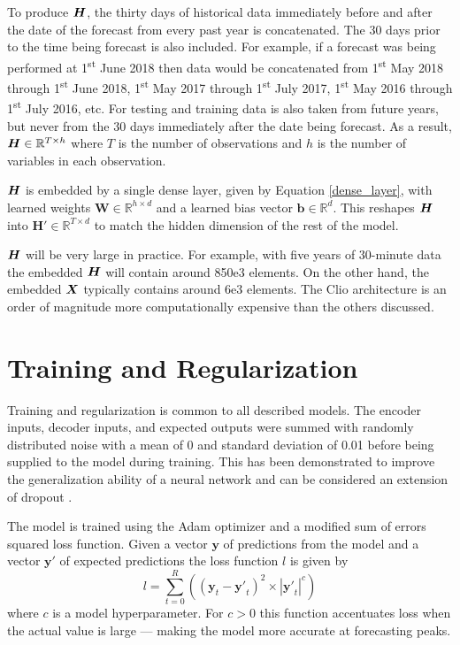 To produce ${\bm{H}}$, the thirty days of historical data immediately before and after the date of the forecast from every past year is concatenated.
The 30 days prior to the time being forecast is also included.
For example, if a forecast was being performed at 1\textsuperscript{st} June 2018 then data would be concatenated from 1\textsuperscript{st} May 2018 through 1\textsuperscript{st} June 2018, 1\textsuperscript{st} May 2017 through 1\textsuperscript{st} July 2017, 1\textsuperscript{st} May 2016 through 1\textsuperscript{st} July 2016, etc.
For testing and training data is also taken from future years, but never from the 30 days immediately after the date being forecast.
As a result, ${\bm{H}} \in \mathbb{R}^{T \times h}$ where $T$ is the number of observations and $h$ is the number of variables in each observation.

${\bm{H}}$ is embedded by a single dense layer, given by Equation \ref{dense_layer}, with learned weights $\boldsymbol{W} \in \mathbb{R}^{h \times d}$ and a learned bias vector $\boldsymbol{b} \in \mathbb{R}^{d}$.
This reshapes ${\bm{H}}$ into $\boldsymbol{H'} \in \mathbb{R}^{T \times d}$ to match the hidden dimension of the rest of the model.

${\bm{H}}$ will be very large in practice.
For example, with five years of 30-minute data the embedded ${\bm{H}}$ will contain around 850e3 elements.
On the other hand, the embedded ${\bm{X}}$ typically contains around 6e3 elements.
The Clio architecture is an order of magnitude more computationally expensive than the others discussed.


\section{Training and Regularization}
Training and regularization is common to all described models.
The encoder inputs, decoder inputs, and expected outputs were summed with randomly distributed noise with a mean of 0 and standard deviation of 0.01 before being supplied to the model during training.
This has been demonstrated to improve the generalization ability of a neural network \cite{Wang1999} \cite{Brown2003} and can be considered an extension of dropout \cite{srivastava14a}.

The model is trained using the Adam optimizer \cite{Kingma2014} and a modified sum of errors squared loss function.
Given a vector $\boldsymbol{y}$ of predictions from the model and a vector $\boldsymbol{y'}$ of expected predictions the loss function $l$ is given by 
\begin{equation}
l = \sum_{t=0}^{R}((\boldsymbol{y}_t - \boldsymbol{y'}_t)^2 \times |\boldsymbol{y'}_t|^c)
\end{equation}
where $c$ is a model hyperparameter.
For $c>0$ this function accentuates loss when the actual value is large --- making the model more accurate at forecasting peaks.


